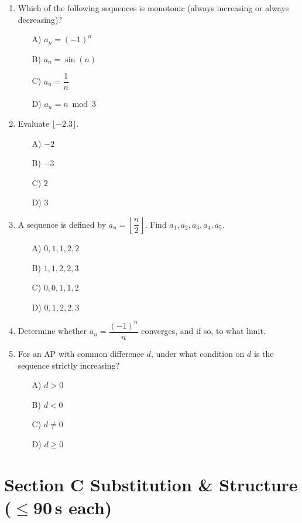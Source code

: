 \documentclass[11pt,a4paper]{article}
\begin{document}
\begin{enumerate}
\item Which of the following sequences is monotonic (always increasing or always decreasing)?
\begin{itemize}
\item[A)] $a_n=(-1)^n$
\item[B)] $a_n=\sin(n)$
\item[C)] $a_n=\dfrac1n$
\item[D)] $a_n=n\bmod3$
\end{itemize}

\item Evaluate $\lfloor-2.3\rfloor$.
\begin{itemize}
\item[A)] $-2$
\item[B)] $-3$
\item[C)] $2$
\item[D)] $3$
\end{itemize}

\item A sequence is defined by $a_n=\left\lfloor\dfrac n2\right\rfloor$. Find $a_1,a_2,a_3,a_4,a_5$.
\begin{itemize}
\item[A)] $0,1,1,2,2$
\item[B)] $1,1,2,2,3$
\item[C)] $0,0,1,1,2$
\item[D)] $0,1,2,2,3$
\end{itemize}

\item Determine whether $a_n=\dfrac{(-1)^n}n$ converges, and if so, to what limit.

\item For an AP with common difference $d$, under what condition on $d$ is the sequence strictly increasing?
\begin{itemize}
\item[A)] $d>0$
\item[B)] $d<0$
\item[C)] $d\neq0$
\item[D)] $d\geq0$
\end{itemize}

\end{enumerate}

\section*{Section C \quad Substitution \& Structure \hfill{\normalfont\small($\leq$90\,s each)}}
\end{document}
